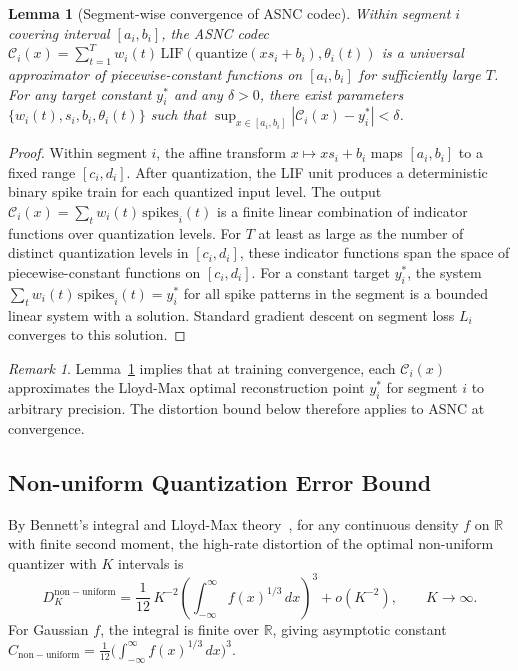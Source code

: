 \documentclass{article}
\theoremstyle{plain}
\newtheorem{lemma}[theorem]{Lemma}
\theoremstyle{definition}
\theoremstyle{remark}
\newtheorem{remark}[theorem]{Remark}
\begin{document}
\begin{lemma}[Segment-wise convergence of ASNC codec]
\label{lem:codec_convergence}
Within segment $i$ covering interval $[a_i, b_i]$, the ASNC codec
$\mathcal{C}_i(x) = \sum_{t=1}^T w_i(t)\,\mathrm{LIF}(\mathrm{quantize}(xs_i +
b_i), \theta_i(t))$ is a universal approximator of piecewise-constant functions on
$[a_i, b_i]$ for sufficiently large $T$. For any target constant $y_i^*$ and any
$\delta > 0$, there exist parameters $\{w_i(t), s_i, b_i, \theta_i(t)\}$ such that
$\sup_{x \in [a_i,b_i]} |\mathcal{C}_i(x) - y_i^*| < \delta$.
\end{lemma}

\begin{proof}
Within segment $i$, the affine transform $x \mapsto xs_i + b_i$ maps $[a_i, b_i]$
to a fixed range $[c_i, d_i]$. After quantization, the LIF unit produces a
deterministic binary spike train for each quantized input level. The output
$\mathcal{C}_i(x) = \sum_t w_i(t)\,\mathrm{spikes}_i(t)$ is a finite linear
combination of indicator functions over quantization levels. For $T$ at least as
large as the number of distinct quantization levels in $[c_i, d_i]$, these indicator
functions span the space of piecewise-constant functions on $[c_i, d_i]$. For a
constant target $y_i^*$, the system $\sum_t w_i(t)\,\mathrm{spikes}_i(t) = y_i^*$
for all spike patterns in the segment is a bounded linear system with a solution.
Standard gradient descent on segment loss $L_i$ converges to this solution.
\end{proof}

\begin{remark}
Lemma~\ref{lem:codec_convergence} implies that at training convergence, each
$\mathcal{C}_i(x)$ approximates the Lloyd-Max optimal reconstruction point $y_i^*$
for segment $i$ to arbitrary precision. The distortion bound below therefore applies
to ASNC at convergence.
\end{remark}

\subsection{Non-uniform Quantization Error Bound}

By Bennett's integral and Lloyd-Max theory~\citep{gersho1992vector}, for any
continuous density $f$ on $\mathbb{R}$ with finite second moment, the high-rate
distortion of the optimal non-uniform quantizer with $K$ intervals is
\[
D_K^{\mathrm{non-uniform}}
= \frac{1}{12}\,K^{-2}
  \left(\int_{-\infty}^{\infty} f(x)^{1/3}\,dx\right)^3
  + o(K^{-2}), \qquad K \to \infty.
\]
For Gaussian $f$, the integral is finite over $\mathbb{R}$, giving asymptotic
constant $C_{\mathrm{non-uniform}} = \tfrac{1}{12}
\bigl(\int_{-\infty}^\infty f(x)^{1/3}\,dx\bigr)^3$.
\end{document}
